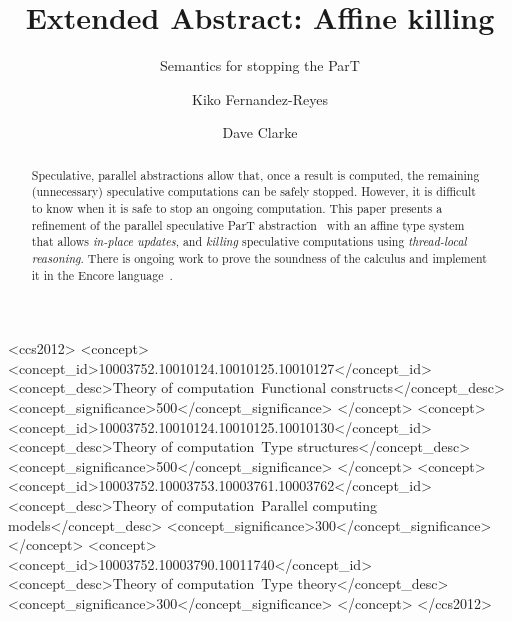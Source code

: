 \documentclass[sigplan]{acmart}
\begin{document}
\title{Extended Abstract: Affine killing}
\subtitle{Semantics for stopping the ParT}

\author{Kiko Fernandez-Reyes}

\author{Dave Clarke}


\begin{abstract}
Speculative, parallel abstractions allow that, once a result is computed,
the remaining (unnecessary) speculative computations can be safely stopped.
%
However, it is difficult to know when it is safe to stop an ongoing computation.
%
This paper presents a refinement of the parallel speculative
ParT abstraction~\cite{DBLP:conf/coordination/Fernandez-Reyes16}
with an affine type system that allows \emph{in-place updates},
and \textit{killing} speculative computations using \emph{thread-local reasoning}.
There is ongoing work to prove the soundness of the calculus
and implement it in the Encore language~\cite{DBLP:conf/sfm/BrandauerCCFJPT15}.
\end{abstract}

%
%
\begin{CCSXML}
<ccs2012>
<concept>
<concept_id>10003752.10010124.10010125.10010127</concept_id>
<concept_desc>Theory of computation~Functional constructs</concept_desc>
<concept_significance>500</concept_significance>
</concept>
<concept>
<concept_id>10003752.10010124.10010125.10010130</concept_id>
<concept_desc>Theory of computation~Type structures</concept_desc>
<concept_significance>500</concept_significance>
</concept>
<concept>
<concept_id>10003752.10003753.10003761.10003762</concept_id>
<concept_desc>Theory of computation~Parallel computing models</concept_desc>
<concept_significance>300</concept_significance>
</concept>
<concept>
<concept_id>10003752.10003790.10011740</concept_id>
<concept_desc>Theory of computation~Type theory</concept_desc>
<concept_significance>300</concept_significance>
</concept>
</ccs2012>
\end{CCSXML}

\end{document}
